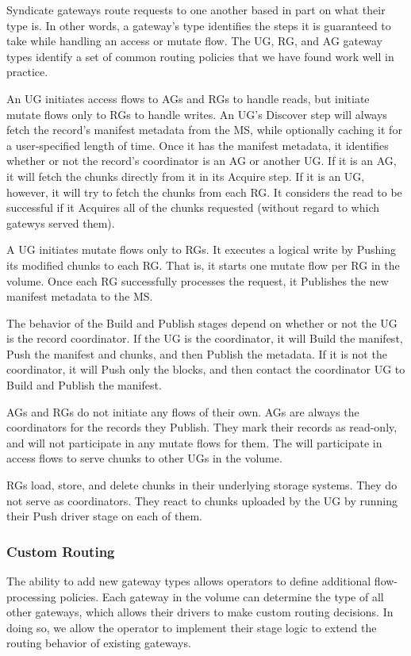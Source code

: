 Syndicate gateways route requests to one another based in part on what their
type is.  In other words, a gateway's type identifies the steps it is guaranteed
to take while handling an access or mutate flow.
The UG, RG, and AG gateway types identify a set of common routing policies that
we have found work well in practice.

An UG initiates access flows to AGs and RGs to handle reads, but initiate mutate
flows only to RGs to handle writes.  An UG's Discover step will always fetch the
record's manifest metadata from the MS, while optionally caching it for a
user-specified length of time.  Once it has the manifest metadata, it identifies
whether or not the record's coordinator is an AG or another UG.   If it is an
AG, it will fetch the chunks directly from it in its Acquire step.  If it is an
UG, however, it will try to fetch the chunks from each RG.  It considers the
read to be successful if it Acquires all of the chunks requested (without regard
to which gatewys served them).

A UG initiates mutate flows only to RGs.  It executes a logical write by Pushing
its modified chunks to each RG.  That is, it starts one mutate flow per RG in
the volume.  Once each RG successfully processes the request, it Publishes the
new manifest metadata to the MS.

The behavior of the Build and Publish stages depend on whether or not the UG is
the record coordinator.  If the UG is the coordinator, it will Build the
manifest, Push the manifest and chunks, and then Publish the metadata.  If it is
not the coordinator, it will Push only the blocks, and then
contact the coordinator UG to Build and Publish the manifest.

AGs and RGs do not initiate any flows of
their own.  AGs are always the coordinators for the records they Publish.  They mark their
records as read-only, and will not participate in any mutate flows for them.
The will participate in access flows to serve chunks to other UGs in the volume.

RGs load, store, and delete chunks in their underlying storage systems.  They do
not serve as coordinators.  They react to chunks uploaded by the UG by running
their Push driver stage on each of them.

\subsubsection{Custom Routing}

The ability to add new gateway types allows operators to define additional
flow-processing policies.  Each gateway in the volume can determine the type of
all other gateways, which allows their drivers to make custom routing decisions.
In doing so, we allow the operator to implement their stage logic to extend the
routing behavior of existing gateways.

